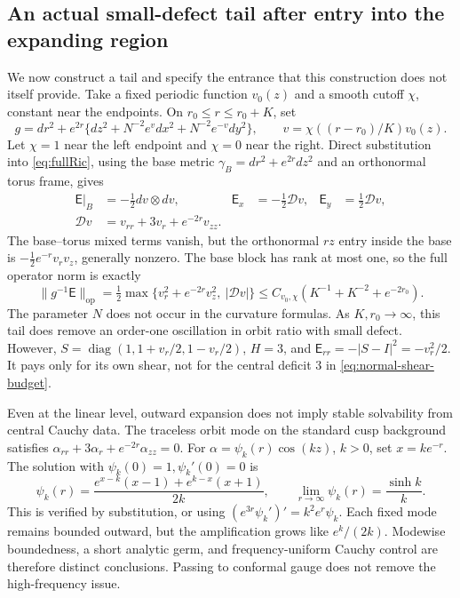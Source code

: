 \documentclass[a4paper,11pt]{article}
\numberwithin{equation}{section}
\theoremstyle{definition}
\newcommand{\op}{\mathrm{op}}
\begin{document}
\subsection{An actual small-defect tail after entry into the expanding region}\label{sec:adiabatic-tail}
We now construct a tail and specify the entrance that this construction does not itself provide.
Take a fixed periodic function $v_0(z)$ and a smooth cutoff $\chi$, constant near the endpoints. On $r_0\le r\le r_0+K$, set
\[
 g=dr^2+e^{2r}\{dz^2+N^{-2}e^v dx^2+N^{-2}e^{-v}dy^2\},
 \qquad v=\chi((r-r_0)/K)v_0(z).
\]
Let $\chi=1$ near the left endpoint and $\chi=0$ near the right.
Direct substitution into \eqref{eq:fullRic}, using the base metric
$\gamma_B=dr^2+e^{2r}dz^2$ and an orthonormal torus frame, gives
\begin{align}
 \mathsf E|_B&=-\tfrac12dv\otimes dv,&
 \mathsf E_x&=-\tfrac12\mathcal Dv,&
 \mathsf E_y&=\tfrac12\mathcal Dv,\nonumber\\
 \mathcal Dv&=v_{rr}+3v_r+e^{-2r}v_{zz}.&&&
 \label{eq:explicit-tail}
\end{align}
The base--torus mixed terms vanish, but the orthonormal $rz$ entry inside the base is $-\frac12e^{-r}v_rv_z$, generally nonzero.
The base block has rank at most one, so the full operator norm is exactly
\begin{equation}\label{eq:explicit-tail-norm}
 \|g^{-1}\mathsf E\|_\op
 =\tfrac12\max\{v_r^2+e^{-2r}v_z^2,\ |\mathcal Dv|\}
 \le C_{v_0,\chi}(K^{-1}+K^{-2}+e^{-2r_0}).
\end{equation}
The parameter $N$ does not occur in the curvature formulas. As $K,r_0\to\infty$, this tail does remove an order-one oscillation in orbit ratio with small defect.
However, $S=\operatorname{diag}(1,1+v_r/2,1-v_r/2)$, $H=3$, and
$\mathsf E_{rr}=-|S-I|^2=-v_r^2/2$.
It pays only for its own shear, not for the central deficit $3$ in \eqref{eq:normal-shear-budget}.

Even at the linear level, outward expansion does not imply stable solvability from central Cauchy data.
The traceless orbit mode on the standard cusp background satisfies
$\alpha_{rr}+3\alpha_r+e^{-2r}\alpha_{zz}=0$.
For $\alpha=\psi_k(r)\cos(kz)$, $k>0$, set $x=ke^{-r}$.
The solution with $\psi_k(0)=1,\psi_k'(0)=0$ is
\begin{equation}\label{eq:cusp-mode-amplification}
 \psi_k(r)=
 \frac{e^{x-k}(x-1)+e^{k-x}(x+1)}{2k},
 \qquad
 \lim_{r\to\infty}\psi_k(r)=\frac{\sinh k}{k}.
\end{equation}
This is verified by substitution, or using $(e^{3r}\psi_k')'=k^2e^r\psi_k$.
Each fixed mode remains bounded outward, but the amplification grows like $e^k/(2k)$.
Modewise boundedness, a short analytic germ, and frequency-uniform Cauchy control are therefore distinct conclusions. Passing to conformal gauge does not remove the high-frequency issue.
\end{document}
